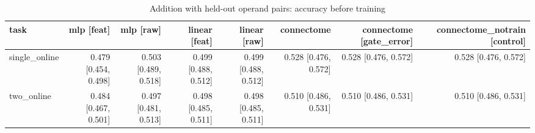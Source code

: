 \begin{table}[t]
\centering
\small
\begin{tabular}{lrrrrrrr}
\toprule
task & mlp [feat] & mlp [raw] & linear [feat] & linear [raw] & connectome & connectome [gate\_error] & connectome\_notrain [control] \\
\midrule
single\_online & 0.479 [0.454, 0.498] & 0.503 [0.489, 0.518] & 0.499 [0.488, 0.512] & 0.499 [0.488, 0.512] & 0.528 [0.476, 0.572] & 0.528 [0.476, 0.572] & 0.528 [0.476, 0.572] \\
two\_online & 0.484 [0.467, 0.501] & 0.497 [0.481, 0.513] & 0.498 [0.485, 0.511] & 0.498 [0.485, 0.511] & 0.510 [0.486, 0.531] & 0.510 [0.486, 0.531] & 0.510 [0.486, 0.531] \\
\bottomrule
\end{tabular}
\caption{Addition with held-out operand pairs: accuracy before training}
\label{tab:disjoint_addition_pre_acc}
\end{table}